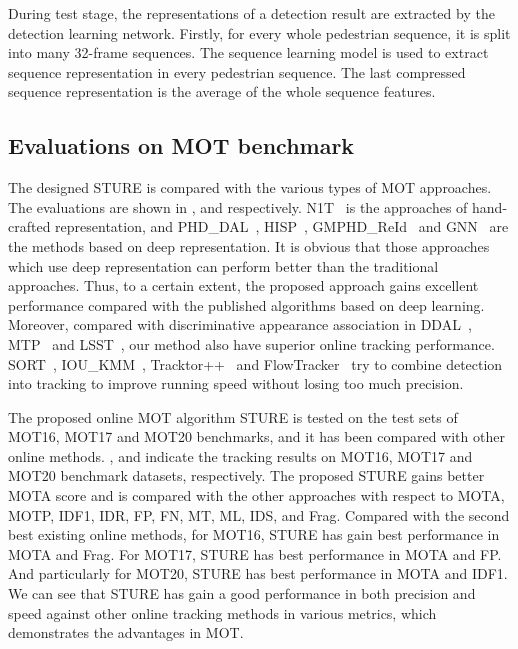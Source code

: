 \documentclass[times,twocolumn,final,authoryear]{elsarticle}
\begin{document}
During test stage, the representations of a detection result are extracted by the detection learning network. 
Firstly, for every whole pedestrian sequence, it is split into many 32-frame sequences.
The sequence learning model is used to extract sequence representation in every pedestrian sequence. 
The last compressed sequence representation is the average of the whole sequence features.



\subsection{Evaluations on {MOT benchmark}} 

{
The designed STURE is compared with the various types of MOT approaches.
The evaluations are shown in ,  and  respectively.
N1T~\citep{baisa2019development} is the approaches of hand-crafted representation, 
and PHD\_DAL~\citep{2019Online}, HISP~\citep{baisa2021robust}, GMPHD\_ReId~\citep{baisa2021occlusion} and GNN~\citep{li2020graph} are the methods based on deep representation.
It is obvious that those approaches which use deep {representation} can perform better than the traditional approaches.
Thus, to a certain extent, the proposed approach gains excellent performance compared with the published algorithms based on deep learning. 
Moreover, compared with discriminative appearance association in DDAL~\citep{RN601}, MTP~\citep{kim2021discriminative} and LSST~\citep{feng2019multi}, our method also have superior online tracking performance.
SORT~\citep{bewley2016simple}, IOU\_KMM~\citep{urbann2021online}, Tracktor++~\citep{bergmann2019tracking} and FlowTracker~\citep{nishimura2021sdof} try to combine detection into tracking to improve running speed without losing too much precision. 
}

{
The proposed online MOT algorithm STURE is tested on the test sets of MOT16, MOT17 and MOT20 benchmarks, and it has been compared with other online methods. 
,  and  indicate the tracking results on MOT16, MOT17 and MOT20 benchmark datasets{,} respectively. 
The proposed STURE gains better MOTA score and is compared with the other approaches with respect to MOTA, MOTP, IDF1, IDR, FP, FN, MT, ML, IDS, and Frag. 
Compared with the second best existing online methods, for MOT16, STURE has gain best performance in MOTA and Frag.
For MOT17, STURE has best performance in MOTA and FP.
And particularly for MOT20, STURE has best performance in MOTA and IDF1.
We can see that STURE has gain a good performance in both precision and speed against other online tracking methods in various metrics, which demonstrates the advantages in MOT.
}
\end{document}
